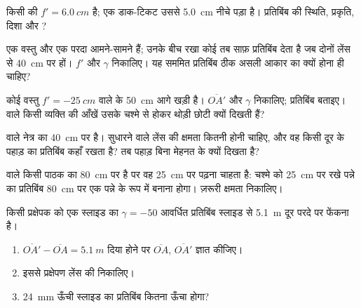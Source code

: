 \begin{exercise}[$\star\star$]\label{exo:g11:lenses-and-eye:7}
किसी  की $f' = \qty{6.0}{cm}$ है; एक डाक-टिकट उससे \qty{5.0}{cm} नीचे पड़ा
है। प्रतिबिंब की स्थिति, प्रकृति, दिशा और ?
\end{exercise}

\begin{exercise}[$\star\star$]\label{exo:g11:lenses-and-eye:8}
एक वस्तु और एक परदा आमने-सामने हैं; उनके बीच रखा कोई  तब साफ़ प्रतिबिंब देता है जब दोनों लेंस से \qty{40}{cm} पर
हों। $f'$ और $\gamma$ निकालिए। यह सममित प्रतिबिंब ठीक असली आकार का
क्यों होना ही चाहिए?
\end{exercise}

\begin{exercise}[$\star\star$]\label{exo:g11:lenses-and-eye:9}
कोई वस्तु $f' = \qty{-25}{cm}$ वाले  के \qty{50}{cm} आगे खड़ी है।
$\overline{OA'}$ और $\gamma$ निकालिए; प्रतिबिंब बताइए।  वाले किसी
व्यक्ति की आँखें उसके चश्मे से होकर थोड़ी छोटी क्यों दिखती हैं?
\end{exercise}

\begin{exercise}[$\star\star$]\label{exo:g11:lenses-and-eye:10}
 वाले नेत्र का  \qty{40}{cm} पर है।
सुधारने वाले लेंस की क्षमता कितनी होनी चाहिए, और वह
किसी दूर के पहाड़ का प्रतिबिंब कहाँ रखता है? तब पहाड़ बिना मेहनत के
क्यों दिखता है?
\end{exercise}

\begin{exercise}[$\star\star$]\label{exo:g11:lenses-and-eye:11}
 वाले किसी पाठक का  \qty{80}{cm} पर है पर वह
\qty{25}{cm} पर पढ़ना चाहता है: चश्मे को \qty{25}{cm} पर रखे पन्ने का प्रतिबिंब
\qty{80}{cm} पर एक  पन्ने के रूप में बनाना होगा। ज़रूरी
क्षमता निकालिए।
\end{exercise}

\begin{exercise}[$\star\star\star$]\label{exo:g11:lenses-and-eye:12}
किसी प्रक्षेपक को एक स्लाइड का $\gamma = -50$ आवर्धित प्रतिबिंब स्लाइड से
\qty{5.1}{m} दूर परदे पर फेंकना है।
\begin{enumerate}
  \item $\overline{OA'} - \overline{OA} = \qty{5.1}{m}$ दिया होने पर $\overline{OA}$, $\overline{OA'}$ ज्ञात कीजिए।
  \item इससे प्रक्षेपण लेंस की  निकालिए।
  \item \qty{24}{mm} ऊँची स्लाइड का प्रतिबिंब कितना ऊँचा होगा?
\end{enumerate}
\end{exercise}

